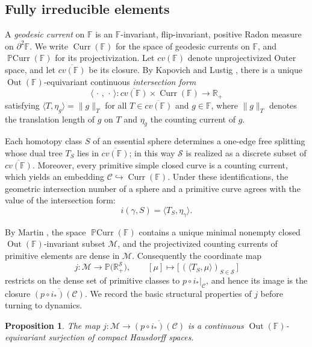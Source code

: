 \documentclass[12pt,a4paper]{amsart}
\numberwithin{equation}{section}
\DeclareMathOperator{\Out}{Out}
\newcommand{\FF}{\mathbb{F}}
\theoremstyle{plain}
\newtheorem{proposition}[theorem]{Proposition}
\theoremstyle{definition}
\theoremstyle{remark}
\begin{document}
\subsection{Fully irreducible elements}

A \emph{geodesic current} on $\FF$ is an $\FF$-invariant, flip-invariant, positive Radon measure on $\partial^2\FF$.
We write $\operatorname{Curr}(\FF)$ for the space of geodesic currents on $\FF$, and $\operatorname{\mathbb{P}Curr}(\FF)$ for its projectivization.
Let $cv(\FF)$ denote unprojectivized Outer space, and let $\overline{cv(\FF)}$ be its closure.
By Kapovich and Lustig \cite{MR2496058}, there is a unique $\Out(\FF)$-equivariant continuous \emph{intersection form}
\[
    \langle\,\cdot\,,\,\cdot\,\rangle \colon \overline{cv(\FF)} \times \operatorname{Curr}(\FF) \longrightarrow \mathbb{R}_+
\]
satisfying $\langle T, \eta_g \rangle = \| g \|_T$ for all $T \in \overline{cv(\FF)}$ and $g \in \FF$, where $\| g \|_T$ denotes the translation length of $g$ on $T$ and $\eta_g$ the counting current of $g$.

Each homotopy class $S$ of an essential sphere determines a one-edge free splitting whose dual tree $T_S$ lies in $\overline{cv(\FF)}$; in this way $\mathcal{S}$ is realized as a discrete subset of $\overline{cv(\FF)}$.
Moreover, every primitive simple closed curve is a counting current, which yields an embedding $\mathcal{C} \hookrightarrow \operatorname{Curr}(\FF)$.
Under these identifications, the geometric intersection number of a sphere and a primitive curve agrees with the value of the intersection form:
\[
    i(\gamma, S) = \langle T_S, \eta_\gamma \rangle.
\]

By Martin \cite{MR2693216}, the space $\operatorname{\mathbb{P}Curr}(\FF)$ contains a unique minimal nonempty closed $\Out(\FF)$-invariant subset $\mathcal{M}$, and the projectivized counting currents of primitive elements are dense in $\mathcal{M}$.
Consequently the coordinate map
\[
    j \colon \mathcal{M} \longrightarrow \mathbb{P}\big(\mathbb{R}_+^{\mathcal{S}}\big), \qquad [\mu] \longmapsto \big[\,(\langle T_S, \mu\rangle)_{S \in \mathcal{S}}\,\big]
\]
restricts on the dense set of primitive classes to $p \circ i_*|_{\mathcal{C}}$, and hence its image is the closure $\overline{(p \circ i_*)(\mathcal{C})}$.
We record the basic structural properties of $j$ before turning to dynamics.

\begin{proposition}\label{prop:surjection}
    The map $j \colon \mathcal{M} \to \overline{(p \circ i_*)(\mathcal{C})}$ is a continuous $\Out(\FF)$-equivariant surjection of compact Hausdorff spaces.
\end{proposition}
\end{document}
